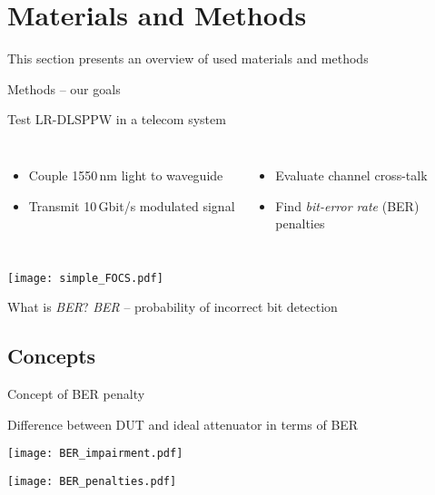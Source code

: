 



\section{Materials and Methods}
  This section presents an overview of used materials and methods
  \begin{frame}{Methods – our goals}
    \begin{block}{Test LR-DLSPPW in a telecom system}
    \begin{columns}
        \begin{itemize}
          \item Couple 1550\,nm light to waveguide
          \item Transmit 10\,Gbit/s modulated signal
        \end{itemize}
        \begin{itemize}
          \item Evaluate channel cross-talk
          \item Find \emph{bit-error rate} (BER)\\
                \hfill penalties~~~
        \end{itemize}
    \end{columns}
    \vspace{-5mm}
        \begin{center}
          \texttt{[image: simple\_FOCS.pdf]}
        \end{center}
    \end{block}
      \begin{exampleblock}{What is \emph{BER}?}
        \emph{BER} – probability of incorrect bit detection\\
      \end{exampleblock}

  \end{frame}

  
 
  \subsection{Concepts} %
  \label{sub:concepts}
  \begin{frame}{Concept of BER penalty}
    \begin{block}{Difference between DUT and ideal attenuator in terms of BER}
      \begin{center}
        \texttt{[image: BER\_impairment.pdf]}
      \end{center}
    \end{block}
    \begin{center}
      \texttt{[image: BER\_penalties.pdf]}
    \end{center}
  \end{frame}



